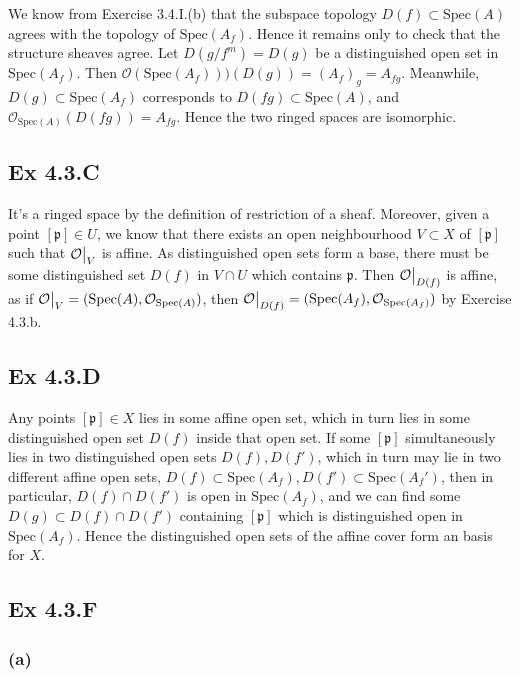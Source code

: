 \documentclass{article}
\newcommand\restr[2]{{%
  \left.\kern-\nulldelimiterspace %
  #1 %
  \vphantom{\big|} %
  \right|_{#2} %
  }}
\theoremstyle{definition}
\newcommand{\Spec}{\text{Spec}}
\begin{document}
We know from Exercise 3.4.I.(b) that the subspace topology $D(f) \subset
\Spec(A)$ agrees with the topology of $\Spec(A_f)$. Hence it remains only to
check that the structure sheaves agree. Let $D(g/f^m) = D(g)$ be a
distinguished open set in $\Spec(A_f)$. Then $\mathcal{O}(\Spec(A_f)))(D(g)) =
(A_f)_{g} = A_{fg}$. Meanwhile, $D(g)  \subset \Spec(A_f)$ corresponds to
$D(fg) \subset \Spec(A)$, and $\mathcal{O}_{\Spec(A)}(D(fg)) = A_{fg}$. Hence
the two ringed spaces are isomorphic.

\subsection*{Ex 4.3.C}

It's a ringed space by the definition of restriction of a sheaf. Moreover,
given a point $[\mathfrak{p}] \in U$, we know that there exists an open
neighbourhood $V \subset X$ of $[\mathfrak{p}]$ such that
$\restr{\mathcal{O}}{V}$ is affine. As distinguished open sets form a base,
there must be some distinguished set $D(f)$ in $V \cap U$ which contains
$\mathfrak{p}$. Then $\restr{\mathcal{O}}{D(f)}$ is affine, as if
$\restr{\mathcal{O}}{V} = (\Spec(A), \mathcal{O}_{\Spec(A)})$, then
$\restr{\mathcal{O}}{D(f)} = (\Spec(A_f), \mathcal{O}_{\Spec(A_f)})$ by
Exercise 4.3.b.

\subsection*{Ex 4.3.D}

Any points $[\mathfrak{p}] \in X$ lies in some affine open set, which in turn
lies in some distinguished open set $D(f)$ inside that open set. If some
$[\mathfrak{p}]$ simultaneously lies in two distinguished open sets $D(f),
D(f')$, which in turn may lie in two different affine open sets, $D(f) \subset
\Spec(A_f), D(f') \subset \Spec(A_f')$, then in particular, $D(f) \cap D(f')$
is open in $\Spec(A_f)$, and we can find some $D(g) \subset D(f) \cap D(f')$
containing $[\mathfrak{p}]$ which is distinguished open in $\Spec(A_f)$. Hence
the distinguished open sets of the affine cover form an basis for $X$.

\subsection*{Ex 4.3.F}

\subsubsection*{(a)}
\end{document}
